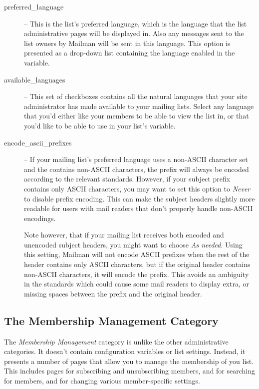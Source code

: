 \documentclass{howto}
\begin{document}
\begin{description}
\item[preferred_language] --
    This is the list's preferred language, which is the language that
    the list administrative pages will be displayed in.  Also any
    messages sent to the list owners by Mailman will be sent in this
    language.  This option is presented as a drop-down list containing
    the language enabled in the  variable.

\item[available_languages] --
    This set of checkboxes contains all the natural languages that
    your site administrator has made available to your mailing lists.
    Select any language that you'd either like your members to be able
    to view the list in, or that you'd like to be able to use in your
    list's  variable.

\item[encode_ascii_prefixes] --
    If your mailing list's preferred language uses a non-ASCII
    character set and the  contains non-ASCII
    characters, the prefix will always be encoded according to the
    relevant standards.  However, if your subject prefix contains only
    ASCII characters, you may want to set this option to \emph{Never}
    to disable prefix encoding.  This can make the subject headers
    slightly more readable for users with mail readers that don't
    properly handle non-ASCII encodings.

    Note however, that if your mailing list receives both encoded and
    unencoded subject headers, you might want to choose \emph{As
    needed}.  Using this setting, Mailman will not encode ASCII
    prefixes when the rest of the header contains only ASCII
    characters, but if the original header contains non-ASCII
    characters, it will encode the prefix.  This avoids an ambiguity
    in the standards which could cause some mail readers to display
    extra, or missing spaces between the prefix and the original
    header.
\end{description}

\subsection{The Membership Management Category}

The \emph{Membership Management} category is unlike the other
administrative categories.  It doesn't contain configuration variables
or list settings.  Instead, it presents a number of pages that allow
you to manage the membership of you list.  This includes pages for
subscribing and unsubscribing members, and for searching for members,
and for changing various member-specific settings.
\end{document}
